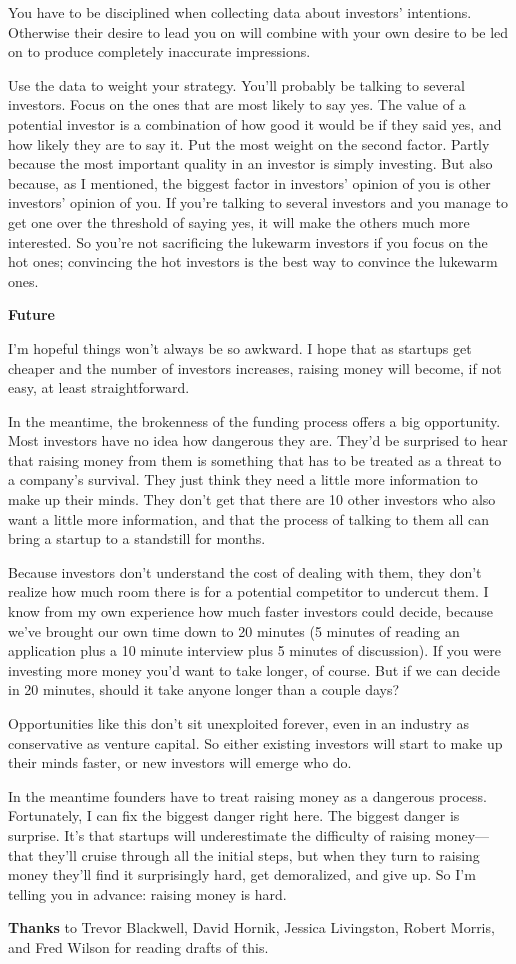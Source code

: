 You have to be disciplined when collecting data about investors'
intentions. Otherwise their desire to lead you on will combine with your
own desire to be led on to produce completely inaccurate impressions.

Use the data to weight your strategy. You'll probably be talking to
several investors. Focus on the ones that are most likely to say yes.
The value of a potential investor is a combination of how good it would
be if they said yes, and how likely they are to say it. Put the most
weight on the second factor. Partly because the most important quality
in an investor is simply investing. But also because, as I mentioned,
the biggest factor in investors' opinion of you is other investors'
opinion of you. If you're talking to several investors and you manage to
get one over the threshold of saying yes, it will make the others much
more interested. So you're not sacrificing the lukewarm investors if you
focus on the hot ones; convincing the hot investors is the best way to
convince the lukewarm ones.

\textbf{Future}

I'm hopeful things won't always be so awkward. I hope that as startups
get cheaper and the number of investors increases, raising money will
become, if not easy, at least straightforward.

In the meantime, the brokenness of the funding process offers a big
opportunity. Most investors have no idea how dangerous they are. They'd
be surprised to hear that raising money from them is something that has
to be treated as a threat to a company's survival. They just think they
need a little more information to make up their minds. They don't get
that there are 10 other investors who also want a little more
information, and that the process of talking to them all can bring a
startup to a standstill for months.

Because investors don't understand the cost of dealing with them, they
don't realize how much room there is for a potential competitor to
undercut them. I know from my own experience how much faster investors
could decide, because we've brought our own time down to 20 minutes (5
minutes of reading an application plus a 10 minute interview plus 5
minutes of discussion). If you were investing more money you'd want to
take longer, of course. But if we can decide in 20 minutes, should it
take anyone longer than a couple days?

Opportunities like this don't sit unexploited forever, even in an
industry as conservative as venture capital. So either existing
investors will start to make up their minds faster, or new investors
will emerge who do.

In the meantime founders have to treat raising money as a dangerous
process. Fortunately, I can fix the biggest danger right here. The
biggest danger is surprise. It's that startups will underestimate the
difficulty of raising money---that they'll cruise through all the
initial steps, but when they turn to raising money they'll find it
surprisingly hard, get demoralized, and give up. So I'm telling you in
advance: raising money is hard.


\textbf{Thanks} to Trevor Blackwell, David Hornik, Jessica Livingston,
Robert Morris, and Fred Wilson for reading drafts of this.